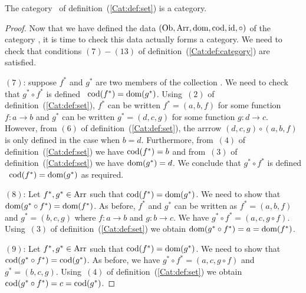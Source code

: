 \begin{prop}\label{Cat:prop:set:is:category}
    The category \Set\ of definition~(\ref{Cat:def:set}) is a category.
\end{prop}
\begin{proof}
    Now that we have defined 
    the data $(\mbox{\rm Ob}, \mbox{\rm Arr}, \mbox{\rm dom}, \mbox{\rm cod}, \mbox{\rm id}, \circ)$ of the category \Set, 
    it is time to check this data actually forms a category. We need to
    check that conditions $(7)-(13)$ of definition~(\ref{Cat:def:category})
    are satisfied. 
    
    $(7)$: suppose $f^{*}$ and $g^{*}$ are two members of 
    the collection \arr. We need to check that $g^{*}\circ f^{*}$ is defined 
    \ifand\ $\mbox{\rm cod}(f^{*})=\mbox{\rm dom}(g^{*})$. Using~$(2)$ of 
    definition~(\ref{Cat:def:set}), $f^{*}$ can be written $f^{*}=(a,b,f)$
    for some function $f:a\to b$ and $g^{*}$ can be written $g^{*}=(d,c,g)$
    for some function $g:d\to c$. However, from $(6)$ of 
    definition~(\ref{Cat:def:set}), the arrrow $(d,c,g)\circ(a,b,f)$ is only 
    defined in the case when $b=d$. Furthermore, from~$(4)$ of 
    definition~(\ref{Cat:def:set}) we have $\mbox{\rm cod}(f^{*})=b$ and from~$(3)$ 
    of definition~(\ref{Cat:def:set}) we have $\mbox{\rm dom}(g^{*})=d$. We conclude
    that $g^{*}\circ f^{*}$ is defined \ifand\ $\mbox{\rm cod}(f^{*})=\mbox{\rm dom}(g^{*})$
    as required.

    $(8)$: Let $f^{*},g^{*}\in\mbox{\rm Arr}$ such that $\mbox{\rm cod}(f^{*})=\mbox{\rm dom}(g^{*})$. 
    We need to show that $\mbox{\rm dom}(g^{*}\circ f^{*})=\mbox{\rm dom}(f^{*})$. As before,
    $f^{*}$ and $g^{*}$ can be written as $f^{*}=(a,b,f)$ and
    $g^{*}=(b,c,g)$ where $f:a\to b$ and $g:b \to c$. We have
    $g^{*}\circ f^{*}=(a,c,g\circ f)$. Using~$(3)$ of 
    definition~(\ref{Cat:def:set}) we obtain $\mbox{\rm dom}(g^{*}\circ f^{*})=a=
    \mbox{\rm dom}(f^{*})$.

    $(9)$: Let $f^{*},g^{*}\in\mbox{\rm Arr}$ such that $\mbox{\rm cod}(f^{*})=\mbox{\rm dom}(g^{*})$. 
    We need to show that $\mbox{\rm cod}(g^{*}\circ f^{*})=\mbox{\rm cod}(g^{*})$. As before,
    we have $g^{*}\circ f^{*}=(a,c,g\circ f)$ and $g^{*}=(b,c,g)$. Using~$(4)$ 
    of definition~(\ref{Cat:def:set}) we obtain $\mbox{\rm cod}(g^{*}\circ f^{*})=c=
    \mbox{\rm cod}(g^{*})$.


\end{proof}
